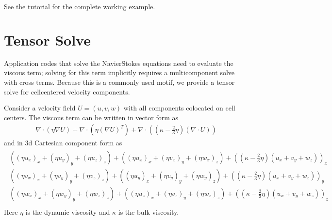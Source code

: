 \documentclass[letterpaper,10pt,english]{sphinxmanual}
\begin{document}
\sphinxAtStartPar
See the  tutorial for the complete working example.


\section{Tensor Solve}
\label{\detokenize{LinearSolvers:tensor-solve}}
\sphinxAtStartPar
Application codes that solve the Navier\sphinxhyphen{}Stokes equations need to evaluate
the viscous term;  solving for this term implicitly requires a multi\sphinxhyphen{}component
solve with cross terms.  Because this is a commonly used motif, we provide
a tensor solve for cell\sphinxhyphen{}centered velocity components.

\sphinxAtStartPar
Consider a velocity field \(U = (u,v,w)\) with all
components co\sphinxhyphen{}located on cell centers.  The viscous term can be written in vector form as
\begin{equation*}
\begin{split}\nabla \cdot (\eta \nabla U) + \nabla \cdot (\eta (\nabla U)^T ) + \nabla \cdot ( (\kappa - \frac{2}{3} \eta) (\nabla \cdot U) )\end{split}
\end{equation*}
\sphinxAtStartPar
and in 3\sphinxhyphen{}d Cartesian component form as
\begin{align*}\!\begin{aligned}
( (\eta u_x)_x + (\eta u_y)_y + (\eta u_z)_z ) + ( (\eta u_x)_x + (\eta v_x)_y + (\eta w_x)_z ) +  ( (\kappa - \frac{2}{3} \eta) (u_x+v_y+w_z) )_x\\
( (\eta v_x)_x + (\eta v_y)_y + (\eta v_z)_z ) + ( (\eta u_y)_x + (\eta v_y)_y + (\eta w_y)_z ) +  ( (\kappa - \frac{2}{3} \eta) (u_x+v_y+w_z) )_y\\
( (\eta w_x)_x + (\eta w_y)_y + (\eta w_z)_z ) + ( (\eta u_z)_x + (\eta v_z)_y + (\eta w_z)_z ) +  ( (\kappa - \frac{2}{3} \eta) (u_x+v_y+w_z) )_z\\
\end{aligned}\end{align*}
\sphinxAtStartPar
Here \(\eta\) is the dynamic viscosity and \(\kappa\) is the bulk viscosity.
\end{document}
